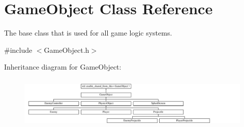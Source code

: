 \hypertarget{class_game_object}{}\section{Game\+Object Class Reference}
\label{class_game_object}


The base class that is used for all game logic systems.  




{\ttfamily \#include $<$Game\+Object.\+h$>$}

Inheritance diagram for Game\+Object\+:\begin{figure}[H]
\begin{center}
\leavevmode
\includegraphics[height=2.527076cm]{d0/dd1/class_game_object}
\end{center}
\end{figure}
